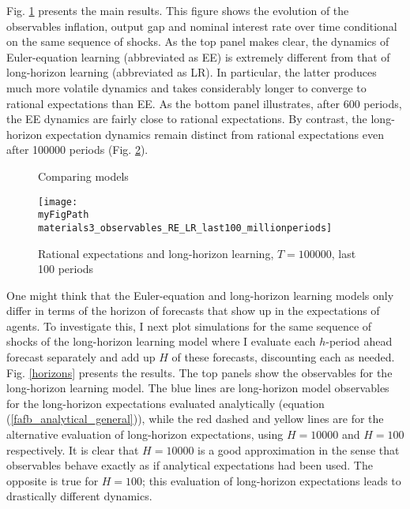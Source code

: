 \documentclass[11pt]{article}
\def \myFigPath {../../figures/}
\renewcommand{\[}{\begin{equation}}
\renewcommand{\]}{\end{equation}}
\def\myFigScale{0.3}
\begin{document}
Fig. \ref{main} presents the main results. This figure shows the evolution of the observables inflation, output gap and nominal interest rate over time conditional on the same sequence of shocks. As the top panel makes clear, the dynamics of Euler-equation learning (abbreviated as EE) is extremely different from that of long-horizon learning (abbreviated as LR). In particular, the latter produces much more volatile dynamics and takes considerably longer to converge to rational expectations than EE. As the bottom panel illustrates, after 600 periods, the EE dynamics are fairly close to rational expectations. By contrast, the long-horizon expectation dynamics remain distinct from rational expectations even after 100000 periods (Fig. \ref{last}).
\begin{figure}[h!]
\caption{Comparing models}
\label{main}
\end{figure}

\begin{figure}[h!]
\texttt{[image: \\myFigPath materials3\_observables\_RE\_LR\_last100\_millionperiods]}
\caption{Rational expectations and long-horizon learning, $T = 100000$, last 100 periods}
\label{last}
\end{figure}

One might think that the Euler-equation and long-horizon learning models only differ in terms of the horizon of forecasts that show up in the expectations of agents. To investigate this, I next plot simulations for the same sequence of shocks of the long-horizon learning model where I evaluate each $h$-period ahead forecast separately and add up $H$ of these forecasts, discounting each as needed. Fig. \ref{horizons} presents the results. The top panels show the observables for the long-horizon learning model. The blue lines are long-horizon model observables for the long-horizon expectations evaluated analytically (equation (\ref{fafb_analytical_general})), while the red dashed and yellow lines are for the alternative evaluation of long-horizon expectations, using $H=10000$ and $H = 100$ respectively. It is clear that $H=10000$ is a good approximation in the sense that observables behave exactly as if analytical expectations had been used. The opposite is true for $H=100$; this evaluation of long-horizon expectations leads to drastically different dynamics. 
\end{document}
